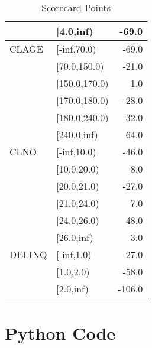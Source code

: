 \begin{appendices}
\begin{table}[H]
\begin{center}
\begin{tabular}{llr}
     &   [4.0,inf) &   -69.0 \\
\midrule
   CLAGE &    [-inf,70.0) &   -69.0 \\
    &   [70.0,150.0) &   -21.0 \\
    &  [150.0,170.0) &     1.0 \\
    &  [170.0,180.0) &   -28.0 \\
    &  [180.0,240.0) &    32.0 \\
    &    [240.0,inf) &    64.0 \\
\midrule
    CLNO &  [-inf,10.0) &   -46.0 \\
     &  [10.0,20.0) &     8.0 \\
     &  [20.0,21.0) &   -27.0 \\
     &  [21.0,24.0) &     7.0 \\
     &  [24.0,26.0) &    48.0 \\
     &   [26.0,inf) &     3.0 \\
\midrule
  DELINQ &  [-inf,1.0) &    27.0 \\
   &   [1.0,2.0) &   -58.0 \\
   &   [2.0,inf) &  -106.0 \\
\bottomrule
\end{tabular}
\caption{Scorecard Points \label{table:scorecard_points}}
\end{center}
\end{table}

\chapter{Python Code}









\end{appendices}
